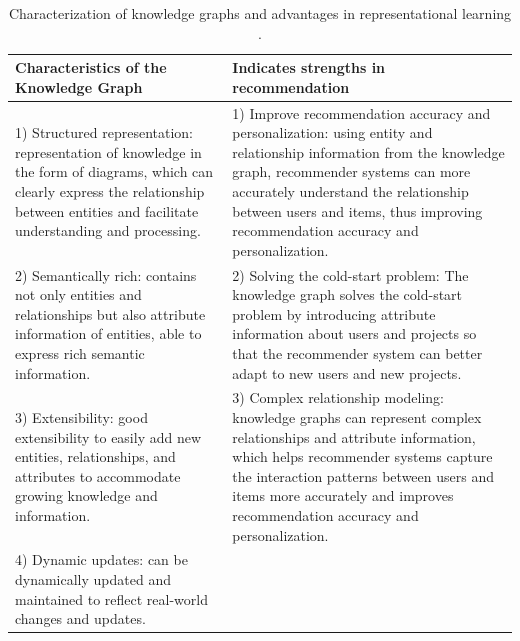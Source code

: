 \begin{table}[h]
\centering
\caption{Characterization of knowledge graphs and advantages in representational learning \parencite{yu2024review}.}
\begin{tabular}{|p{}|p{}|}
\hline
\textbf{Characteristics of the Knowledge Graph} & \textbf{Indicates strengths in recommendation} \\
\hline
1) Structured representation: representation of knowledge in the form of diagrams, which can clearly express the relationship between entities and facilitate understanding and processing. & 1) Improve recommendation accuracy and personalization: using entity and relationship information from the knowledge graph, recommender systems can more accurately understand the relationship between users and items, thus improving recommendation accuracy and personalization. \\
\hline
2) Semantically rich: contains not only entities and relationships but also attribute information of entities, able to express rich semantic information. & 2) Solving the cold-start problem: The knowledge graph solves the cold-start problem by introducing attribute information about users and projects so that the recommender system can better adapt to new users and new projects. \\
\hline
3) Extensibility: good extensibility to easily add new entities, relationships, and attributes to accommodate growing knowledge and information. & 3) Complex relationship modeling: knowledge graphs can represent complex relationships and attribute information, which helps recommender systems capture the interaction patterns between users and items more accurately and improves recommendation accuracy and personalization. \\
\hline
4) Dynamic updates: can be dynamically updated and maintained to reflect real-world changes and updates. & \\
\hline
\end{tabular}
\end{table}